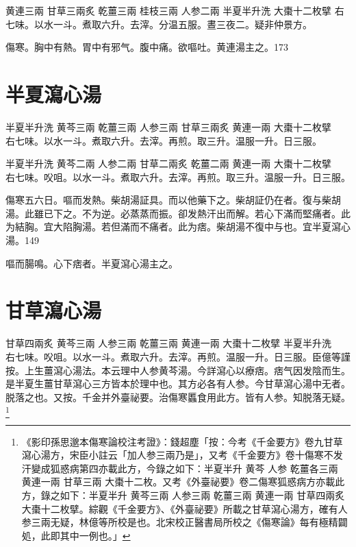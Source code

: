 黄連{\scriptsize 三兩} 甘草{\scriptsize 三兩炙} 乾薑{\scriptsize 三兩} 桂枝{\scriptsize 三兩} 人参{\scriptsize 二兩} 半夏{\scriptsize 半升洗} 大棗{\scriptsize 十二枚擘}
右七味。以水一斗。煮取六升。去滓。分温五服。晝三夜二。疑非仲景方。

傷寒。胸中有熱。胃中有邪气。腹中痛。欲嘔吐。黄連湯主之。173

\section{半夏瀉心湯}

半夏{\scriptsize 半升洗} 黄芩{\scriptsize 三兩} 乾薑{\scriptsize 三兩} 人参{\scriptsize 三兩} 甘草{\scriptsize 三兩炙} 黄連{\scriptsize 一兩} 大棗{\scriptsize 十二枚擘}\\
右七味。以水一斗。煮取六升。去滓。再煎。取三升。温服一升。日三服。{\zhaoben}

半夏{\scriptsize 半升洗} 黄芩{\scriptsize 二兩} 人参{\scriptsize 二兩} 甘草{\scriptsize 二兩炙} 乾薑{\scriptsize 二兩} 黄連{\scriptsize 一兩} 大棗{\scriptsize 十二枚擘}\\
右七味。㕮咀。以水一斗。煮取六升。去滓。再煎。取三升。温服一升。日三服。{\wuben}

傷寒五六日。嘔而发熱。柴胡湯証具。而以他藥下之。柴胡証仍在者。復与柴胡湯。此雖已下之。不为逆。必蒸蒸而振。卻发熱汗出而解。若心下滿而堅痛者。此为結胸。宜大陷胸湯。若但滿而不痛者。此为痞。柴胡{\khaaitp 湯}不復中与也。宜半夏瀉心湯。149

嘔而腸鳴。心下痞者。半夏瀉心湯主之。

\section{甘草瀉心湯}

甘草{\scriptsize 四兩炙} 黄芩{\scriptsize 三兩} 人参{\scriptsize 三兩} 乾薑{\scriptsize 三兩} 黄連{\scriptsize 一兩} 大棗{\scriptsize 十二枚擘} 半夏{\scriptsize 半升洗}\\
右七味。㕮咀。以水一斗。煮取六升。去滓。再煎。温服一升。日三服。{\scriptsize 臣億等謹按。上生薑瀉心湯法。本云理中人参黄芩湯。今詳瀉心以療痞。痞气因发陰而生。是半夏生薑甘草瀉心三方皆本於理中也。其方必各有人参。今甘草瀉心湯中无者。脱落之也。又按。千金并外臺祕要。治傷寒䘌食用此方。皆有人参。知脱落无疑。}
	\footnote{
		《影印孫思邈本傷寒論校注考證》：錢超塵「按：今考《千金要方》卷九甘草瀉心湯方，宋臣小註云「加人参三兩乃是」，又考《千金要方》卷十傷寒不发汗變成狐惑病第四亦載此方，今錄之如下：半夏{\scriptsize 半升}{ }黄芩{ }人参{ }乾薑{\scriptsize 各三兩}{ }黄連{\scriptsize 一兩}{ }甘草{\scriptsize 三兩}{ }大棗{\scriptsize 十二枚}。又考《外臺祕要》卷二傷寒狐惑病方亦載此方，錄之如下：半夏{\scriptsize 半升}{ }黄芩{\scriptsize 三兩}{ }人参{\scriptsize 三兩}{ }乾薑{\scriptsize 三兩}{ }黄連{\scriptsize 一兩}{ }甘草{\scriptsize 四兩炙}{ }大棗{\scriptsize 十二枚擘}。綜觀《千金要方》、《外臺祕要》所載之甘草瀉心湯方，確有人参三兩无疑，林億等所校是也。北宋校正醫書局所校之《傷寒論》每有極精闢処，此即其中一例也。」
	}

